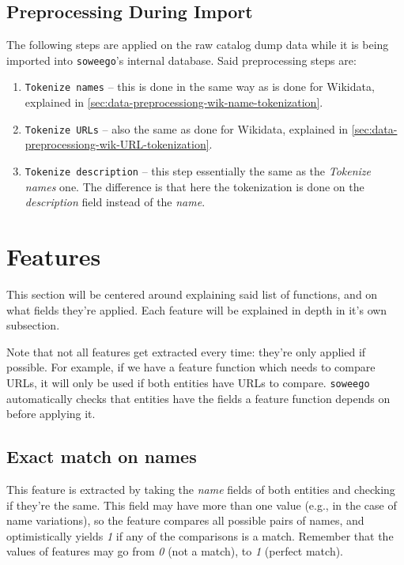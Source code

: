 \documentclass[epsfig,a4paper,11pt,titlepage,twoside,openany]{book}
\newcommand{\soweego}[0]{\texttt{soweego}}
\begin{document}
\subsection{Preprocessing During Import}
\label{sec:data-preprocessing-import}

The following steps are applied on the raw catalog dump data while it is being imported into \soweego's internal database. Said preprocessing steps are:

\begin{enumerate}
    \item \texttt{Tokenize names} -- this is done in the same way as is done for Wikidata, explained in \autoref{sec:data-preprocessiong-wik-name-tokenization}.
    
    \item \texttt{Tokenize URLs} -- also the same as done for Wikidata, explained in \autoref{sec:data-preprocessiong-wik-URL-tokenization}.
    
    \item \texttt{Tokenize description} -- this step essentially the same as the \textit{Tokenize names} one. The difference is that here the tokenization is done on the \textit{description} field instead of the \textit{name}.
\end{enumerate}




\section{Features}
\label{sec:used-features}

This section will be centered around explaining said list of functions, and on what fields they're applied. Each feature will be explained in depth in it's own subsection.

Note that not all features get extracted every time: they're only applied if possible. For example, if we have a feature function which needs to compare URLs, it will only be used if both entities have URLs to compare. \texttt{soweego} automatically checks that entities have the fields a feature function depends on before applying it.


\subsection{Exact match on names}
\label{sec:feature-exact-match-names}

This feature is extracted by taking the \textit{name} fields of both entities and checking if they're the same. This field may have more than one value (e.g., in the case of name variations), so the feature compares all possible pairs of names, and optimistically yields \textit{1} if any of the comparisons is a match. Remember that the values of features may go from \textit{0} (not a match), to \textit{1} (perfect match). 
\end{document}
